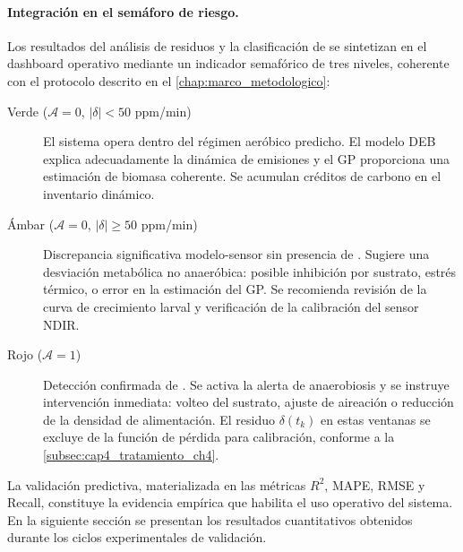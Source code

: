 \paragraph{Integración en el semáforo de riesgo.}
Los resultados del análisis de residuos y la clasificación de  se sintetizan en el dashboard operativo mediante un indicador semafórico de tres niveles, coherente con el protocolo descrito en el \cref{chap:marco_metodologico}:

\begin{description}
    \item[Verde ($\mathcal{A}=0$, $|\delta| < \num{50}$ ppm/min)] El sistema opera dentro del régimen aeróbico predicho. El modelo DEB explica adecuadamente la dinámica de emisiones y el GP proporciona una estimación de biomasa coherente. Se acumulan créditos de carbono en el inventario dinámico.
    
    \item[Ámbar ($\mathcal{A}=0$, $|\delta| \geq \num{50}$ ppm/min)] Discrepancia significativa modelo-sensor sin presencia de . Sugiere una desviación metabólica no anaeróbica: posible inhibición por sustrato, estrés térmico, o error en la estimación del GP. Se recomienda revisión de la curva de crecimiento larval y verificación de la calibración del sensor NDIR.
    
    \item[Rojo ($\mathcal{A}=1$)] Detección confirmada de . Se activa la alerta de anaerobiosis y se instruye intervención inmediata: volteo del sustrato, ajuste de aireación o reducción de la densidad de alimentación. El residuo $\delta(t_k)$ en estas ventanas se excluye de la función de pérdida para calibración, conforme a la \cref{subsec:cap4_tratamiento_ch4}.
\end{description}

La validación predictiva, materializada en las métricas $R^2$, MAPE, RMSE y Recall, constituye la evidencia empírica que habilita el uso operativo del sistema. En la siguiente sección se presentan los resultados cuantitativos obtenidos durante los ciclos experimentales de validación.
